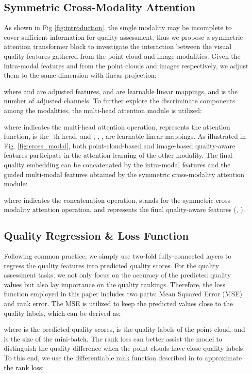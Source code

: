 \documentclass{article}
\begin{document}
\subsection{Symmetric Cross-Modality Attention}
As shown in Fig \ref{fig:introduction}, the single modality may be incomplete to cover sufficient information for quality assessment, thus we propose a symmetric attention transformer block to investigate the interaction between the visual quality features gathered from the point cloud and image modalities. Given the intra-modal features  and  from the point clouds and images respectively, we adjust them to the same dimension with linear projection:

where  and  are adjusted features,  and  are learnable linear mappings, and  is the number of adjusted channels. To further explore the discriminate components among the modalities, the multi-head attention module is utilized:


where  indicates the multi-head attention operation,  represents the attention function,  is the -th head, and , , ,  are learnable linear mappings. As illustrated in Fig. \ref{fig:cross_modal}, both point-cloud-based and image-based quality-aware features participate in the attention learning of the other modality. The final quality embedding can be concatenated by the intra-modal features and the guided multi-modal features obtained by the symmetric cross-modality attention module:


where  indicates the concatenation operation,  stands for the symmetric cross-modality attention operation, and  represents the final quality-aware features (, ).




\subsection{Quality Regression \& Loss Function}
Following common practice, we simply use two-fold fully-connected layers to regress the quality features  into predicted quality scores.
For the quality assessment tasks, we not only focus on the accuracy of the predicted quality values but also lay importance on the quality rankings. Therefore, the loss function employed in this paper includes two parts: Mean Squared Error (MSE) and rank error. The MSE is utilized to keep the predicted values close to the quality labels, which can be derived as:


where  is the predicted quality scores,  is the quality labels of the point cloud, and  is the size of the mini-batch. The rank loss can better assist the model to distinguish the quality difference when the point clouds have close quality labels. To this end, we use the differentiable rank function described in \cite{sun2022deep} to approximate the rank loss:
\end{document}
